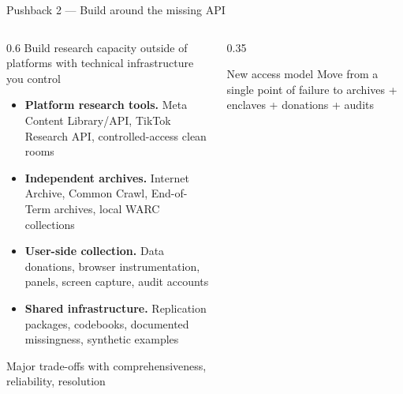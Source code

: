 \documentclass[9pt,aspectratio=169]{beamer}
\begin{document}
\begin{frame}{Pushback 2 --- Build around the missing API}
    \begin{columns}[T]
        \begin{column}{0.6\textwidth}
            Build research capacity outside of platforms with technical infrastructure you control

            \medskip

            \begin{itemize}\small
                \item \textbf{Platform research tools.} Meta Content Library/API, TikTok Research API, controlled-access clean rooms
                \item \textbf{Independent archives.} Internet Archive, Common Crawl, End-of-Term archives, local WARC collections
                \item \textbf{User-side collection.} Data donations, browser instrumentation, panels, screen capture, audit accounts
                \item \textbf{Shared infrastructure.} Replication packages, codebooks, documented missingness, synthetic examples
            \end{itemize}

            \medskip

            Major trade-offs with comprehensiveness, reliability, resolution
        \end{column}
        \begin{column}{0.35\textwidth}
            \begin{alertblock}{New access model}
                \small
                Move from a single point of failure to archives + enclaves + donations + audits
            \end{alertblock}
        \end{column}
    \end{columns}
\end{frame}
\end{document}
